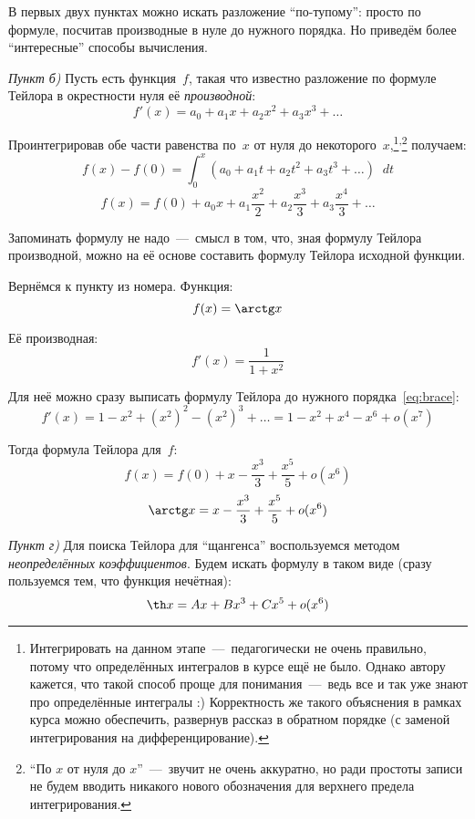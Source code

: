 \documentclass[a4paper,12pt]{article}
\newcommand{\diff}{\mathop{}\!d}
\begin{document}
  \begin{solution}
    В первых двух пунктах можно искать разложение ``по-тупому'': просто по формуле, посчитав производные в нуле до нужного порядка.
    Но приведём более ``интересные'' способы вычисления.

    \medskip
    
    \emph{Пункт б)}
    Пусть есть функция~$f$, такая что известно разложение по формуле Тейлора в окрестности нуля её \emph{производной}:
    \[
      f'(x) = a_0 + a_1 x + a_2 x^2 + a_3 x^3 + \ldots
    \]

    Проинтегрировав обе части равенства по~$x$ от нуля до некоторого~$x$,\footnote{
      Интегрировать на данном этапе~---~педагогически не очень правильно, потому что определённых интегралов в курсе ещё не было.
      Однако автору кажется, что такой способ проще для понимания~---~ведь все и так уже знают про определённые интегралы :)
      Корректность же такого объяснения в рамках курса можно обеспечить, развернув рассказ в обратном порядке (с заменой интегрирования на дифференцирование).
    }\textsuperscript{,}\footnote{
      ``По $x$ от нуля до $x$''~---~звучит не очень аккуратно, но ради простоты записи не будем вводить никакого нового обозначения для верхнего предела интегрирования.
    } получаем:
    \[
      f(x) - f(0) = \int_0^x (a_0 + a_1 t + a_2 t^2 + a_3 t^3 + \ldots) \diff t
    \]
    \[
      f(x) = f(0) + a_0 x + a_1 \frac{x^2}{2} + a_2 \frac{x^3}{3} + a_3 \frac{x^4}{3} + \ldots
    \]

    Запоминать формулу не надо~---~смысл в том, что, зная формулу Тейлора производной, можно на её основе составить формулу Тейлора исходной функции.
    
    \medskip

    Вернёмся к пункту из номера.
    Функция:
    \[
      f(x) = \arctg x
    \]

    Её производная:
    \[
      f'(x) = \frac{1}{1 + x^2}
    \]

    Для неё можно сразу выписать формулу Тейлора до нужного порядка~\eqref{eq:brace}:
    \[
      f'(x) = 1 - x^2 + (x^2)^2 - (x^2)^3 + \ldots
        = 1 - x^2 + x^4 - x^6  + o(x^7)
    \]

    Тогда формула Тейлора для~$f$:
    \[
      f(x) = f(0) + x - \frac{x^3}{3} + \frac{x^5}{5} + o(x^6)
    \]
    \[
      \arctg x = x - \frac{x^3}{3} + \frac{x^5}{5} + o(x^6)
    \]

    \medskip

    \emph{Пункт г)}
    Для поиска Тейлора для ``щангенса'' воспользуемся методом \emph{неопределённых коэффициентов}.
    Будем искать формулу в таком виде (сразу пользуемся тем, что функция нечётная):
    \[
      \th x = A x + B x^3 + C x^5 + o(x^6)
    \]


\end{solution}
\end{document}

